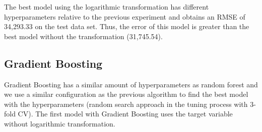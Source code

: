 \documentclass[11pt,a4paper]{article}
\begin{document}
The best model using the logarithmic transformation has different
hyperparameters relative to the previous experiment and obtains an RMSE
of 34,293.33 on the test data set. Thus, the error of this model is
greater than the best model without the transformation (31,745.54).

\hypertarget{gradient-boosting}{%
\subsection{Gradient Boosting}\label{gradient-boosting}}

Gradient Boosting has a similar amount of hyperparameters as random
forest and we use a similar configuration as the previous algorithm to
find the best model with the hyperparameters (random search approach in
the tuning process with 3-fold CV). The first model with Gradient
Boosting uses the target variable without logarithmic transformation.
\end{document}
